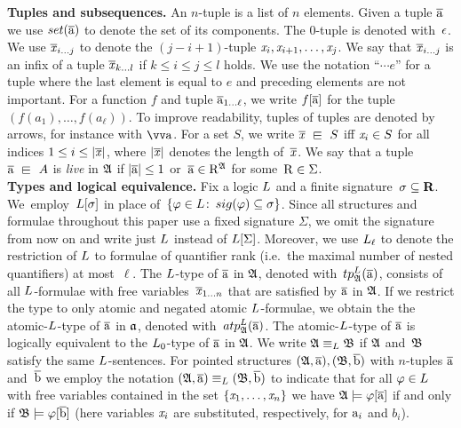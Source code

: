 \noindent \textbf{Tuples and subsequences.}
An $n$-tuple is a list of $n$ elements.
Given a tuple $\overline{\mathrm{a}}$ we use $\set(\elemtuplea)$ to denote the set of its components. 
The $0$-tuple is denoted with~$\epsilon$.
We use $\overline{\mathit{x}}_{i\ldots j}$ to denote the $(j{-}i{+}1)$-tuple $\mathit{x}_i, \mathit{x}_{i+1}, \ldots, \mathit{x}_j$.
We say that $\overline{\mathit{x}}_{i\ldots j}$ is an infix of a tuple $\overline{\mathit{x}}_{k\ldots l}$ if $k \leq i \leq j \leq l$ holds.
We use the notation ``$\cdots e$'' for a tuple where the last element is equal to $e$ and preceding elements are not important.
For a function $f$ and tuple $\overline{\mathrm{a}}_{1\ldots\ell}$, we write $f[\overline{\mathrm{a}}]$ for the tuple $(f(a_{1}), \ldots, f(a_{\ell}))$.
To improve readability, tuples of tuples are denoted by arrows, for instance with $\elemtuptuplea$.
For a set $S$, we write $\vartuplex \sqin S$ iff $\mathit{x}_i \in S$ for all indices $1 \leq i \leq |\overline{\mathit{x}}|$, where $|\overline{\mathit{x}}|$ denotes the length of~$\overline{\mathit{x}}$. 
We say that a tuple $\elemtuplea \sqin A$ is \emph{live} in ${\mathfrak{A}}$ if $|\overline{\mathrm{a}}| \leq 1$ or~$\overline{\mathrm{a}} \in \mathrm{R}^{{\mathfrak{A}}}$ for some~$\mathrm{R} \in \Sigma$.\\

\noindent \textbf{Types and logical equivalence.}
Fix a logic $\logicL$ and a finite signature~$\sigma \subseteq \mathbf{R}$. 
We~employ~$\logicL[\sigma]$ in place of~$\{ \varphi \in \logicL \colon\,  \sig(\varphi) \subseteq \sigma \}$.
Since all structures and formulae throughout this paper use a fixed signature $\Sigma$, we omit the signature from now on and write just $\logicL$ instead of $\logicL[\Sigma]$.
Moreover, we use $\logicL_\ell$ to denote the restriction of $\logicL$ to formulae of quantifier rank (i.e.\ the maximal number of nested quantifiers) at most~$\ell$.
%
The $\logicL$-type of $\overline{\mathrm{a}}$ in ${\mathfrak{A}}$, denoted with~$\tp{\logicL}{\str{A}}{\elemtuplea}$, consists of all $\logicL$-formulae with free variables~$\overline{\mathit{x}}_{1\ldots n}$ that are satisfied by $\overline{\mathrm{a}}$ in ${\mathfrak{A}}$.
If we restrict the type to only atomic and negated atomic $\logicL$-formulae, we obtain the the atomic-$\logicL$-type of $\overline{\mathrm{a}}$ in ${\mathfrak{a}}$, denoted with~$\atp{\logicL}{\str{A}}{\elemtuplea}$.
The atomic-$\logicL$-type of $\overline{\mathrm{a}}$ is logically equivalent to the $\logicL_{0}$-type of $\overline{\mathrm{a}}$ in ${\mathfrak{A}}$.
We write $\str{A} \equiv_\logicL \str{B}$ if ${\mathfrak{A}}$ and~${\mathfrak{B}}$ satisfy the same $\logicL$-sentences.
For pointed structures $({\mathfrak{A}}, \overline{\mathrm{a}}), ({\mathfrak{B}}, \overline{\mathrm{b}})$ with $n$-tuples $\overline{\mathrm{a}}$ and~$\overline{\mathrm{b}}$ we employ the notation $(\str{A}, \elemtuplea) \equiv_\logicL (\str{B}, \elemtupleb)$ to indicate that for all $\varphi \in \logicL$ with free variables contained in the set $\{ \mathit{x}_1, \ldots, \mathit{x}_n \}$ we have ${\mathfrak{A}} \models \varphi[\overline{\mathrm{a}}]$ if and only if ${\mathfrak{B}} \models \varphi[\overline{\mathrm{b}}]$ (here variables $\mathit{x}_i$ are substituted, respectively, for $\mathrm{a}_i$ and $b_i$).\\


